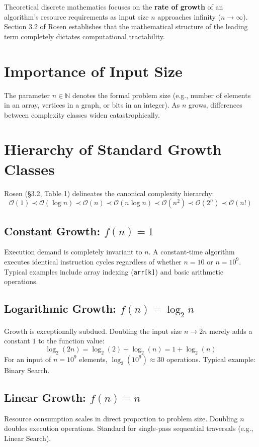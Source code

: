 \documentclass[11pt,a4paper,oneside]{report}
\theoremstyle{definition}
\begin{document}
Theoretical discrete mathematics focuses on the \textbf{rate of growth} of an algorithm's resource requirements as input size $n$ approaches infinity ($n \to \infty$). Section 3.2 of Rosen \cite{rosen2019discrete} establishes that the mathematical structure of the leading term completely dictates computational tractability.

\section{Importance of Input Size}
The parameter $n \in \mathbb{N}$ denotes the formal problem size (e.g., number of elements in an array, vertices in a graph, or bits in an integer). As $n$ grows, differences between complexity classes widen catastrophically.

\section{Hierarchy of Standard Growth Classes}
Rosen (§3.2, Table 1) \cite{rosen2019discrete} delineates the canonical complexity hierarchy:
\begin{equation}
\mathcal{O}(1) \prec \mathcal{O}(\log n) \prec \mathcal{O}(n) \prec \mathcal{O}(n \log n) \prec \mathcal{O}(n^2) \prec \mathcal{O}(2^n) \prec \mathcal{O}(n!)
\label{eq:hierarchy}
\end{equation}

\subsection{Constant Growth: $f(n) = 1$}
Execution demand is completely invariant to $n$. A constant-time algorithm executes identical instruction cycles regardless of whether $n = 10$ or $n = 10^9$. Typical examples include array indexing (\texttt{arr[k]}) and basic arithmetic operations.

\subsection{Logarithmic Growth: $f(n) = \log_2 n$}
Growth is exceptionally subdued. Doubling the input size $n \to 2n$ merely adds a constant $1$ to the function value:
$$\log_2(2n) = \log_2(2) + \log_2(n) = 1 + \log_2(n)$$
For an input of $n = 10^9$ elements, $\log_2(10^9) \approx 30$ operations. Typical example: Binary Search.

\subsection{Linear Growth: $f(n) = n$}
Resource consumption scales in direct proportion to problem size. Doubling $n$ doubles execution operations. Standard for single-pass sequential traversals (e.g., Linear Search).
\end{document}
